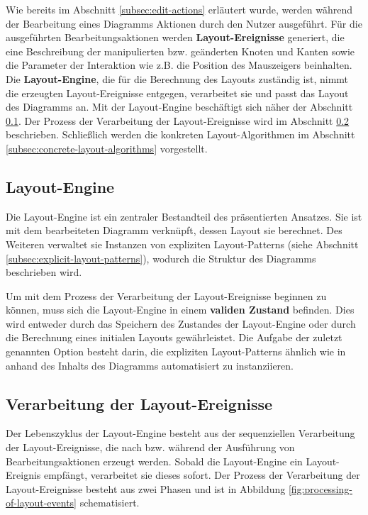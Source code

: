 Wie bereits im Abschnitt \ref{subsec:edit-actions} erläutert wurde, werden während der Bearbeitung eines Diagramms Aktionen durch den Nutzer ausgeführt. Für die ausgeführten Bearbeitungsaktionen werden \textbf{Layout-Ereignisse} generiert, die eine Beschreibung der manipulierten bzw. geänderten Knoten und Kanten sowie die Parameter der Interaktion wie z.B. die Position des Mauszeigers beinhalten. Die \textbf{Layout-Engine}, die für die Berechnung des Layouts zuständig ist, nimmt die erzeugten Layout-Ereignisse entgegen, verarbeitet sie und passt das Layout des Diagramms an. Mit der Layout-Engine beschäftigt sich näher der Abschnitt \ref{subsec:layout-engine}. Der Prozess der Verarbeitung der Layout-Ereignisse wird im Abschnitt \ref{subsec:processing-of-layout-events} beschrieben. Schließlich werden die konkreten Layout-Algorithmen im Abschnitt \ref{subsec:concrete-layout-algorithms} vorgestellt.

\subsection{Layout-Engine}
\label{subsec:layout-engine}

Die Layout-Engine ist ein zentraler Bestandteil des präsentierten Ansatzes. Sie ist mit dem bearbeiteten Diagramm verknüpft, dessen Layout sie berechnet. Des Weiteren verwaltet sie Instanzen von expliziten Layout-Patterns (siehe Abschnitt \ref{subsec:explicit-layout-patterns}), wodurch die Struktur des Diagramms beschrieben wird.

Um mit dem Prozess der Verarbeitung der Layout-Ereignisse beginnen zu können, muss sich die Layout-Engine in einem \textbf{validen Zustand} befinden. Dies wird entweder durch das Speichern des Zustandes der Layout-Engine oder durch die Berechnung eines initialen Layouts gewährleistet. Die Aufgabe der zuletzt genannten Option besteht darin, die expliziten Layout-Patterns ähnlich wie in \cite{MaierMinas13A-Pattern-based} anhand des Inhalts des Diagramms automatisiert zu instanziieren.

\subsection{Verarbeitung der Layout-Ereignisse}
\label{subsec:processing-of-layout-events}

Der Lebenszyklus der Layout-Engine besteht aus der sequenziellen Verarbeitung der Layout-Ereignisse, die nach bzw. während der Ausführung von Bearbeitungsaktionen erzeugt werden. Sobald die Layout-Engine ein Layout-Ereignis empfängt, verarbeitet sie dieses sofort. Der Prozess der Verarbeitung der Layout-Ereignisse besteht aus zwei Phasen und ist in Abbildung \ref{fig:processing-of-layout-events} schematisiert.

